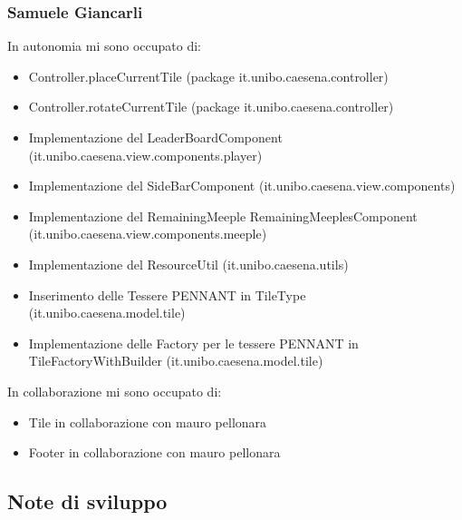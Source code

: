 \subsubsection*{Samuele Giancarli}
In autonomia mi sono occupato di:
\begin{itemize}
    \item Controller.placeCurrentTile (package it.unibo.caesena.controller)
    \item Controller.rotateCurrentTile (package it.unibo.caesena.controller)
    \item Implementazione del LeaderBoardComponent (it.unibo.caesena.view.components.player)
    \item Implementazione del SideBarComponent (it.unibo.caesena.view.components)
    \item Implementazione del RemainingMeeple RemainingMeeplesComponent (it.unibo.caesena.view.components.meeple)
    \item Implementazione del ResourceUtil (it.unibo.caesena.utils)
    \item Inserimento delle Tessere PENNANT in TileType (it.unibo.caesena.model.tile)
    \item Implementazione delle Factory per le tessere PENNANT in TileFactoryWithBuilder (it.unibo.caesena.model.tile)
\end{itemize}

In collaborazione mi sono occupato di:
\begin{itemize}
    \item Tile in collaborazione con mauro pellonara
    \item Footer in collaborazione con mauro pellonara
\end{itemize}

\subsection{Note di sviluppo}
